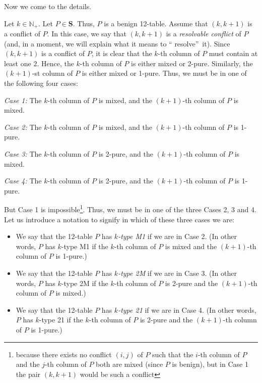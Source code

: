 \documentclass[numbers=enddot,12pt,final,onecolumn,notitlepage]{scrartcl}%
\theoremstyle{definition}
\begin{document}
Now we come to the details.

Let $k\in\mathbb{N}_{+}$. Let $P\in\mathbf{S}$. Thus, $P$ is a benign
12-table. Assume that $\left(  k,k+1\right)  $ is a conflict of $P$. In this
case, we say that $\left(  k,k+1\right)  $ is a \textit{resolvable conflict}
of $P$ (and, in a moment, we will explain what it means to \textquotedblleft
resolve\textquotedblright\ it). Since $\left(  k,k+1\right)  $ is a conflict
of $P$, it is clear that the $k$-th column of $P$ must contain at least one
$2$. Hence, the $k$-th column of $P$ is either mixed or 2-pure. Similarly, the
$\left(  k+1\right)  $-st column of $P$ is either mixed or 1-pure. Thus, we
must be in one of the following four cases:

\textit{Case 1:} The $k$-th column of $P$ is mixed, and the $\left(
k+1\right)  $-th column of $P$ is mixed.

\textit{Case 2:} The $k$-th column of $P$ is mixed, and the $\left(
k+1\right)  $-th column of $P$ is 1-pure.

\textit{Case 3:} The $k$-th column of $P$ is 2-pure, and the $\left(
k+1\right)  $-th column of $P$ is mixed.

\textit{Case 4:} The $k$-th column of $P$ is 2-pure, and the $\left(
k+1\right)  $-th column of $P$ is 1-pure.

But Case 1 is impossible\footnote{because there exists no conflict $\left(
i,j\right)  $ of $P$ such that the $i$-th column of $P$ and the $j$-th column
of $P$ both are mixed (since $P$ is benign), but in Case 1 the pair $\left(
k,k+1\right)  $ would be such a conflict}. Thus, we must be in one of the
three Cases 2, 3 and 4. Let us introduce a notation to signify in which of
these three cases we are:

\begin{itemize}
\item We say that the 12-table $P$ has $k$\textit{-type M1} if we are in Case
2. (In other words, $P$ has $k$-type M1 if the $k$-th column of $P$ is mixed
and the $\left(  k+1\right)  $-th column of $P$ is 1-pure.)

\item We say that the 12-table $P$ has $k$\textit{-type 2M} if we are in Case
3. (In other words, $P$ has $k$-type 2M if the $k$-th column of $P$ is 2-pure
and the $\left(  k+1\right)  $-th column of $P$ is mixed.)

\item We say that the 12-table $P$ has $k$\textit{-type 21} if we are in Case
4. (In other words, $P$ has $k$-type 21 if the $k$-th column of $P$ is 2-pure
and the $\left(  k+1\right)  $-th column of $P$ is 1-pure.)
\end{itemize}
\end{document}
